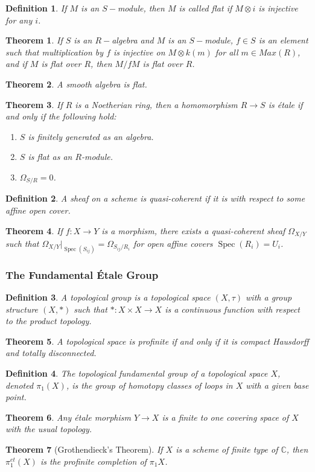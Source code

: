 \documentclass{article}
\theoremstyle{mystyle}
\newtheorem{theorem}{Theorem}[section]
\newtheorem{definition}{Definition}[section]
\DeclareMathOperator{\Spec}{Spec}
\begin{document}
\begin{definition}
If $M$ is an $S-$module, then $M$ is called flat if $M\otimes i$ is injective for any $i$.
\end{definition}
\begin{theorem}
If $S$ is an $R-$algebra and $M$ is an $S-$module, $f\in S$ is an element such that multiplication by $f$ is injective on $M\otimes k(m)$ for all $m \in Max(R)$, and if $M$ is flat over $R$, then $M/fM$ is flat over $R$.
\end{theorem}
\begin{theorem}
A smooth algebra is flat.
\end{theorem}
\begin{theorem}
If $R$ is a Noetherian ring, then a homomorphism $R\rightarrow S$ is \'{e}tale if and only if the following hold:
\begin{enumerate}
    \item $S$ is finitely generated as an algebra.
    \item $S$ is flat as an $R$-module.
    \item $\Omega_{S/R} = 0$.
\end{enumerate}
\end{theorem}
\begin{definition}
A sheaf on a scheme is quasi-coherent if it is with respect to some affine open cover.
\end{definition}
\begin{theorem}
If $f:X\rightarrow Y$ is a morphism, there exists a quasi-coherent sheaf $\Omega_{X/Y}$ such that $\Omega_{X/Y}\big|_{\Spec(S_{ij})} = \Omega_{S_{ij}/R_i}$ for open affine covers $\Spec(R_i) = U_i$.
\end{theorem}
\subsubsection{The Fundamental \'{E}tale Group}
\begin{definition}
A topological group is a topological space $(X,\tau)$ with a group structure $(X,*)$ such that $*:X\times X\rightarrow X$ is a continuous function with respect to the product topology.
\end{definition}
\begin{theorem}
A topological space is profinite if and only if it is compact Hausdorff and totally disconnected.
\end{theorem}
\begin{definition}
The topological fundamental group of a topological space $X$, denoted $\pi_1(X)$, is the group of homotopy classes of loops in $X$ with a given base point.
\end{definition}
\begin{theorem}
Any \'{e}tale morphism $Y\rightarrow X$ is a finite to one covering space of $X$ with the usual topology.
\end{theorem}
\begin{theorem}[Grothendieck's Theorem]
If $X$ is a scheme of finite type of $\mathbb{C}$, then $\pi_{1}^{et}(X)$ is the profinite completion of $\pi_1{X}$.
\end{theorem}
\end{document}
